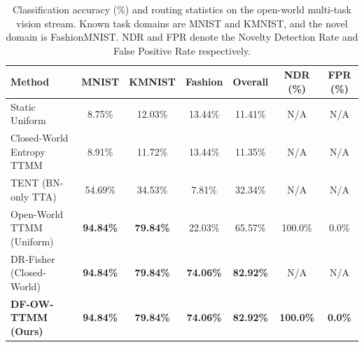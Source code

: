 \documentclass{article}
\theoremstyle{plain}
\theoremstyle{definition}
\theoremstyle{remark}
\begin{document}
\begin{table}[t]
\caption{Classification accuracy (\%) and routing statistics on the open-world multi-task vision stream. Known task domains are MNIST and KMNIST, and the novel domain is FashionMNIST. NDR and FPR denote the Novelty Detection Rate and False Positive Rate respectively.}
\label{tab:results}
\vskip 0.15in
\begin{center}
\begin{footnotesize}
\setlength{\tabcolsep}{6.0pt}
\begin{tabular}{lcccccc}
\toprule
Method & MNIST & KMNIST & Fashion & Overall & NDR (\%) & FPR (\%) \\
\midrule
Static Uniform & 8.75\% & 12.03\% & 13.44\% & 11.41\% & N/A & N/A \\
Closed-World Entropy TTMM & 8.91\% & 11.72\% & 13.44\% & 11.35\% & N/A & N/A \\
TENT (BN-only TTA) & 54.69\% & 34.53\% & 7.81\% & 32.34\% & N/A & N/A \\
Open-World TTMM (Uniform) & \textbf{94.84\%} & \textbf{79.84\%} & 22.03\% & 65.57\% & 100.0\% & 0.0\% \\
DR-Fisher (Closed-World) & \textbf{94.84\%} & \textbf{79.84\%} & \textbf{74.06\%} & \textbf{82.92\%} & N/A & N/A \\
\midrule
\textbf{DF-OW-TTMM (Ours)} & \textbf{94.84\%} & \textbf{79.84\%} & \textbf{74.06\%} & \textbf{82.92\%} & \textbf{100.0\%} & \textbf{0.0\%} \\
\bottomrule
\end{tabular}
\end{footnotesize}
\end{center}
\vskip -0.1in
\end{table}
\end{document}
